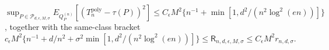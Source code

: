 \(\displaystyle \sup_{P\in\mathcal P_{d,\epsilon,M,\sigma}}E_{Q_P^{(n)}}[(T_n^{\mathrm{poly}}-\tau(P))^2]\le C_{\epsilon}M^2\{n^{-1}+\min[1,d^2/(n^2\log^2(en))]\}\), together with the same-class bracket \(\displaystyle c_{\epsilon}M^2\{n^{-1}+d/n^2+\sigma^2\min[1,d^2/(n^2\log^2(en))]\}\le\mathsf R_{n,d,\epsilon,M,\sigma}\le C_{\epsilon}M^2r_{n,d,\sigma}\).